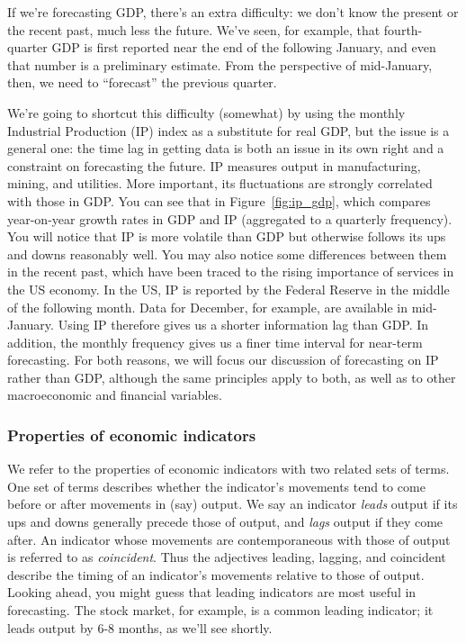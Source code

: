 \documentclass[letterpaper,12pt]{article}
\begin{document}
If we're forecasting GDP, there's an extra difficulty: we don't
know the present or the recent past, much less the future. We've
seen, for example, that fourth-quarter GDP is first reported near
the end of the following January, and even that number is a
preliminary estimate. From the perspective of mid-January, then,
we need to ``forecast'' the previous quarter.


We're going to shortcut this difficulty (somewhat) by using the
monthly Industrial Production (IP) index as a substitute for real
GDP, but the issue is a general one:  the time lag in getting data
is both an issue in its own right and a  constraint on forecasting
the future. IP measures output in manufacturing, mining, and
utilities. More important, its fluctuations are strongly
correlated with those in GDP.  You can see that in
Figure~\ref{fig:ip_gdp}, which compares year-on-year growth rates
in GDP and IP (aggregated to a quarterly frequency). You will
notice that IP is more volatile than GDP but otherwise follows its
ups and downs reasonably well.  You may also notice some
differences between them in the recent past, which have been
traced to the rising importance of services in the US economy.  In
the US, IP is reported by the Federal Reserve in the middle of the
following month.  Data for December, for example, are available in
mid-January.  Using IP therefore gives us a shorter information
lag than GDP.  In addition, the monthly frequency gives us a finer
time interval for near-term forecasting.  For both reasons, we
will focus our discussion of forecasting on IP rather than GDP,
although the same principles apply to both, as well as to other
macroeconomic and financial variables.


\subsubsection*{Properties of economic indicators}

We refer to the properties of economic indicators with 
two related sets of terms.
One set of terms describes whether the indicator's movements
tend to come before or after movements in (say) output.  
We say an indicator {\it leads\/} output if 
its ups and downs generally precede those of output, 
and {\it lags\/} output if they come after.  
An indicator whose movements are contemporaneous with those of output 
is referred to as {\it coincident\/}.
Thus the adjectives leading, lagging, and  coincident 
describe the timing of an indicator's movements relative to those of output.
Looking ahead, you might guess that leading indicators are 
most useful in forecasting.  
The stock market, for example, is a common leading indicator;
it leads output by 6-8 months, as we'll see shortly.  
\end{document}
